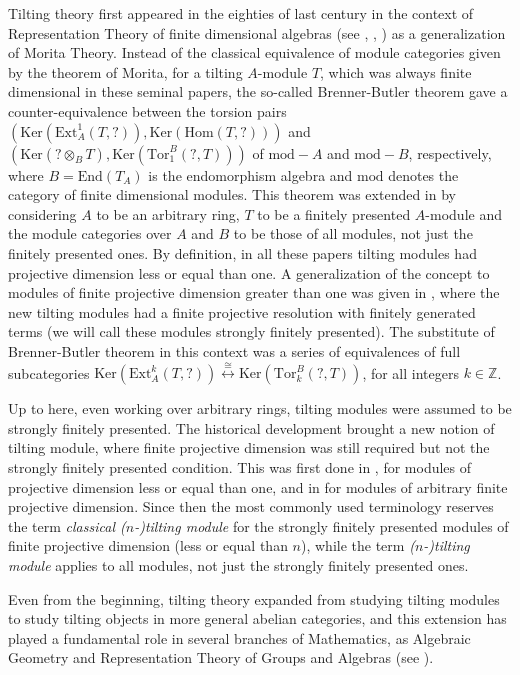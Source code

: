 \documentclass{proc-l}
\theoremstyle{definition}
\theoremstyle{remark}
\numberwithin{equation}{section}
\begin{document}
Tilting theory first appeared in the eighties of last century in the context of Representation Theory of finite dimensional algebras (see \cite{BB}, \cite{HR}, \cite{B}) as a generalization of Morita Theory.  Instead of the classical equivalence of module categories given by the theorem of Morita, for a tilting $A$-module $T$, which was always finite dimensional in these seminal papers,  the so-called Brenner-Butler theorem gave a counter-equivalence between the torsion pairs $(\text{Ker}(\text{Ext}_A^1(T,?)),\text{Ker}(\text{Hom}(T,?)))$ and $(\text{Ker}(?\otimes_BT),\text{Ker}(\text{Tor}_1^B(?,T)))$ of $\text{mod}-A$ and $\text{mod}-B$, respectively, where $B=\text{End}(T_A)$ is the endomorphism algebra and $\text{mod}$ denotes the category of finite dimensional modules. This theorem was extended in \cite{CF} by considering $A$ to be an arbitrary ring, $T$ to be a finitely presented $A$-module and the module categories over $A$ and $B$ to be those of all modules, not just
 the finitely presented ones. By definition, in all these papers tilting modules had projective dimension less or equal than one. A generalization of the concept to modules of finite projective dimension greater than one was given in \cite{M}, where the new tilting modules had a finite projective resolution with finitely generated terms (we will call these modules strongly finitely presented). The substitute of Brenner-Butler theorem in this context was a series of equivalences of full subcategories  $\text{Ker}(\text{Ext}_A^k(T,?))\stackrel{\cong}{\longleftrightarrow}\text{Ker}(\text{Tor}_k^B(?,T))$, for all integers $k\in\mathbb{Z}$. 

Up to here, even working over arbitrary rings, tilting modules were assumed to be strongly finitely presented. The historical development brought a new notion of tilting module, where finite projective dimension was still required but not the strongly finitely presented condition. This was first done in \cite{CT}, for modules of projective dimension less or equal than one, and in \cite{AC} for modules of  arbitrary finite projective dimension. Since then the most commonly used terminology reserves the term \emph{classical ($n$-)tilting module} for the strongly finitely presented modules of finite projective dimension (less or equal than $n$), while the term \emph{($n$-)tilting module} applies to all modules, not just the strongly finitely presented ones. 

Even from the beginning, tilting theory expanded from studying tilting modules to study tilting objects in more general abelian categories,  and this extension has played  a fundamental role in several branches of Mathematics, as Algebraic Geometry and Representation Theory of Groups and Algebras (see \cite{AHK}).  
\end{document}
